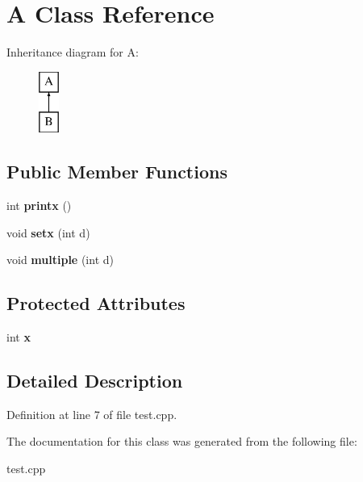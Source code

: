 \hypertarget{class_a}{}\section{A Class Reference}
\label{class_a}
Inheritance diagram for A\+:\begin{figure}[H]
\begin{center}
\leavevmode
\includegraphics[height=2.000000cm]{class_a}
\end{center}
\end{figure}
\subsection*{Public Member Functions}
\begin{DoxyCompactItemize}
\item 
\mbox{\label{class_a_a9757167931400b08ff8eb7cbebe6f777}} 
int {\bfseries printx} ()
\item 
\mbox{\label{class_a_a4749b9f61ffe65a096a8d333f08b5c2e}} 
void {\bfseries setx} (int d)
\item 
\mbox{\label{class_a_a5872b97d29efe450d3a283d8e9ef22c5}} 
void {\bfseries multiple} (int d)
\end{DoxyCompactItemize}
\subsection*{Protected Attributes}
\begin{DoxyCompactItemize}
\item 
\mbox{\label{class_a_ac88449f5677bb5bf7923a9127979a200}} 
int {\bfseries x}
\end{DoxyCompactItemize}


\subsection{Detailed Description}


Definition at line 7 of file test.\+cpp.



The documentation for this class was generated from the following file\+:\begin{DoxyCompactItemize}
\item 
test.\+cpp\end{DoxyCompactItemize}
